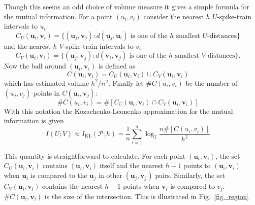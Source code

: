 \documentclass[12pt]{article}
\renewcommand{\u}{\mathbf{u}}
\renewcommand{\v}{\mathbf{v}}
\begin{document}
Though this seems an odd choice of volume measure it gives a simple
formula for the mutual information. For a point $(u_i,v_i)$ consider
the nearest $h$ $U$-spike-train intervals to $u_i$:
\begin{equation}
C_U(\u_i,\v_i)=\{(\u_j,\v_j): d(\u_j,\u_i)\mbox{ is one of the }h\mbox{ smallest $U$-distances} \}
\end{equation}
and the nearest $h$ $V$-spike-train intervals to $v_i$
\begin{equation}
C_V(\u_i,\v_i)=\{(\u_j,\v_j): d(\v_i,\v_j)\mbox{ is one of the }h\mbox{ smallest $V$-distances}\}.
\end{equation}
Now the ball around $(\u_i,\v_i)$ is defined as
\begin{equation}
C(\u_i,\v_i)=C_U(\u_i,\v_i)\cup C_V(\u_i,\v_i)
\end{equation}
which has estimated volume $h^2/n^2$. Finally let $\#C(u_i,v_i)$ be the
number of $(u_j,v_j)$ points in $C(\u_i,\v_j)$:
\begin{equation}
\#C(u_i,v_i)=\#[C_U(\u_i,\v_i)\cap C_V(\u_i,\v_i)]
\end{equation}
With this notation the  Kozachenko-Leonenko approximation for the mutual information is given
\begin{equation}
I(U;V)\approx I_{\text{KL}}(\mathcal{P};h)=\frac{1}{n}\sum_{i=1}^n\log_2{\frac{n\#[C(u_i,v_i)]}{h^2}}
\end{equation}

This quantity is straightforward to calculate. For each point
$(\u_i,\v_i)$, the set $C_U(\u_i,\v_i)$ contains $(\u_i,\v_i)$ itself
and the nearest $h-1$ points to $(\u_i,\v_i)$ when $\u_i$ is compared
to the $\u_j$ in other $(\u_j,\v_j)$ pairs. Similarly, the set
$C_V(\u_i,\v_i)$ contains the nearest $h-1$ points when $\v_i$ is
compared to $v_j$. $\#C(\u_i,\v_i)$ is the size of the
intersection. This is illustrated in Fig.~\ref{fig_region}.
\end{document}
